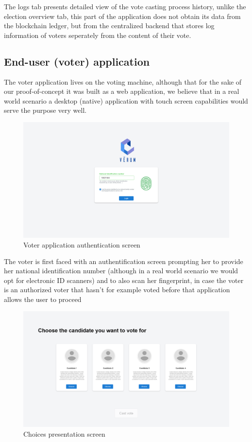 The logs tab presents detailed view of the vote casting process history, unlike the election overview tab, this part of the application does not obtain its data from the blockchain ledger, but from the centralized backend that stores log information of voters seperately from the content of their vote.

\subsection{End-user (voter) application}

The voter application lives on the voting machine, although that for the sake of our proof-of-concept it was built as a web application, we believe that in a real world scenario a desktop (native) application with touch screen capabilities would serve the purpose very well.

\begin{figure}[H]
	\centering
		\includegraphics[width=14cm]{images/chapter3/voter_2.png}
		\caption{{\footnotesize Voter application authentication screen}}
\end{figure}

The voter is first faced with an authentification screen prompting her to provide her national identification number (although in a real world scenario we would opt for electronic ID scanners) and to also scan her fingerprint, in case the voter is an authorized voter that hasn't for example voted before that application allows the user to proceed

\begin{figure}[H]
	\centering
		\includegraphics[width=14cm]{images/chapter3/voter_3.png}
		\caption{{\footnotesize Choices presentation screen}}
\end{figure}

